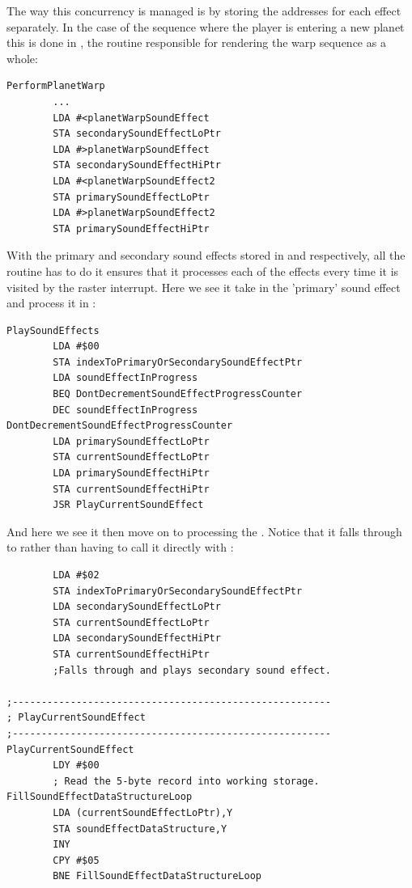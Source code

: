 The way this concurrency is managed is by storing the addresses for each effect separately. In the case of the sequence
where the player is entering a new planet this is done in , the routine responsible for rendering
the warp sequence as a whole:

\begin{lstlisting}
PerformPlanetWarp
        ...
        LDA #<planetWarpSoundEffect
        STA secondarySoundEffectLoPtr
        LDA #>planetWarpSoundEffect
        STA secondarySoundEffectHiPtr
        LDA #<planetWarpSoundEffect2
        STA primarySoundEffectLoPtr
        LDA #>planetWarpSoundEffect2
        STA primarySoundEffectHiPtr
\end{lstlisting}

With the primary and secondary sound effects stored in  and 
respectively, all the  routine has to do it ensures that it processes each of the effects every time it
is visited by the raster interrupt.  Here we see it take in the 'primary' sound effect and process it in :

\begin{lstlisting}
PlaySoundEffects
        LDA #$00
        STA indexToPrimaryOrSecondarySoundEffectPtr
        LDA soundEffectInProgress
        BEQ DontDecrementSoundEffectProgressCounter
        DEC soundEffectInProgress
DontDecrementSoundEffectProgressCounter   
        LDA primarySoundEffectLoPtr
        STA currentSoundEffectLoPtr
        LDA primarySoundEffectHiPtr
        STA currentSoundEffectHiPtr
        JSR PlayCurrentSoundEffect
\end{lstlisting}

And here we see it then move on to processing the . Notice that it falls through to 
rather than having to call it directly with :

\begin{lstlisting}
        LDA #$02
        STA indexToPrimaryOrSecondarySoundEffectPtr
        LDA secondarySoundEffectLoPtr
        STA currentSoundEffectLoPtr
        LDA secondarySoundEffectHiPtr
        STA currentSoundEffectHiPtr
        ;Falls through and plays secondary sound effect.

;-------------------------------------------------------
; PlayCurrentSoundEffect
;-------------------------------------------------------
PlayCurrentSoundEffect
        LDY #$00
        ; Read the 5-byte record into working storage.
FillSoundEffectDataStructureLoop   
        LDA (currentSoundEffectLoPtr),Y
        STA soundEffectDataStructure,Y
        INY
        CPY #$05
        BNE FillSoundEffectDataStructureLoop

\end{lstlisting}

